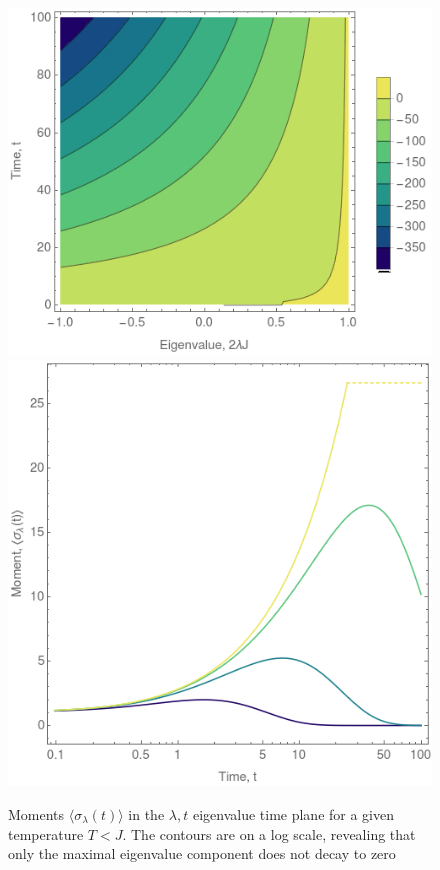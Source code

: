 \documentclass{article}[12pt]
\numberwithin{equation}{section}
\begin{document}
\begin{figure}[H]
\centering{}
\captionsetup{justification=centering}
\includegraphics[scale=0.4]{figures/wigner}
\includegraphics[scale=0.33]{figures/wigner1}
\caption{Moments $\langle \sigma_{\lambda}(t)\rangle$
in the $\lambda,t$ eigenvalue time plane for a given temperature $T<J$. The contours are on a log
scale, revealing that only the maximal eigenvalue component does not decay to zero}
\label{fig:wigner}
\end{figure}
\end{document}
